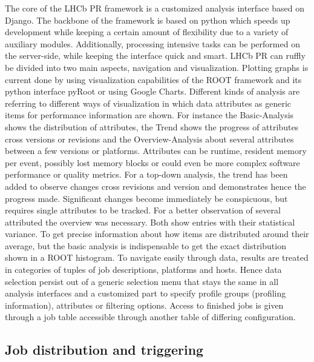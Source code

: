 \documentclass[a4paper]{jpconf}
\begin{document}
The core of the LHCb PR framework is a customized analysis interface based on Django. The backbone of the framework is based on python which speeds up development while keeping a certain amount of flexibility due to a variety of auxiliary modules. Additionally, processing intensive tasks can be performed on the server-side, while keeping the interface quick and smart.
\newline
LHCb PR can ruffly be divided into two main aspects, navigation and visualization. Plotting graphs is current done by using visualization capabilities of the ROOT framework and its python interface pyRoot or using Google Charts. Different kinds of analysis are referring to different ways of visualization in which data attributes as generic items for performance information are shown. For instance the Basic-Analysis shows the distribution of attributes, the Trend shows the progress of attributes cross versions or revisions and the Overview-Analysis about several attributes between a few versions or platforms. Attributes can be runtime, resident memory per event, possibly lost memory blocks or could even be more complex software performance or quality metrics.
\newline
For a top-down analysis, the trend has been added to observe changes cross revisions and version and demonstrates hence the progress made. Significant changes become immediately be conspicuous, but requires single attributes to be tracked. For a better observation of several attributed the overview was necessary. Both show entries with their statistical variance. To get precise information about how items are distributed around their average, but the basic analysis is indispensable to get the exact distribution shown in a ROOT histogram.
\newline
To navigate easily through data, results are treated in categories of tuples of job descriptions, platforms and hosts. Hence data selection persist out of a generic selection menu that stays the same in all analysis interfaces and a customized part to specify profile groups (profiling information), attributes or filtering options. Access to finished jobs is given through a job table accessible through another table of differing configuration.  

\subsection{Job distribution and triggering}
\label{sec:job_distribution}
\end{document}
